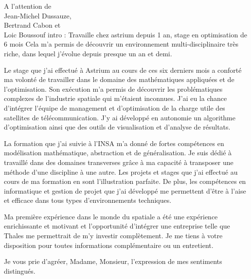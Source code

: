 \documentclass[12pt]{lettre}
\begin{document}
\begin{letter}{A l'attention de\\Jean-Michel Dussauze,\\Bertrand Cabon et\\ Loic Boussouf}
intro : Travaille chez astrium depuis 1 an, stage en optimisation de 6 mois
Cela m’a permis de découvrir un environnement multi-disciplinaire très riche, dans lequel j'évolue depuis presque un an et demi.


Le stage que j'ai effectué à Astrium au cours de ces six derniers mois a conforté ma volonté de travailler dans le domaine des mathématiques appliquées et de l'optimisation. Son exécution m'a permis de découvrir les problématiques complexes de l'industrie spatiale qui m'étaient inconnues. J'ai eu la chance d'intégrer l'équipe de management et d'optimisation de la charge utile des satellites de télécommunication. J'y ai développé en autonomie un algorithme d'optimisation ainsi que des outils de visualisation et d'analyse de résultats.

La formation que j'ai suivie à l'INSA m'a donné de fortes compétences en modélisation mathématique, abstraction et de généralisation. Je suis dédié à travaillé dans des domaines transverses grâce à ma capacité à transposer une méthode d'une discipline à une autre. Les projets et stages que j'ai effectué au cours de ma formation en sont l'illustration parfaite. De plus, les compétences en informatique et gestion de projet que j'ai développé me permettent d'être à l'aise et efficace dans tous types d'environnements techniques.%

Ma première expérience dans le monde du spatiale a été une expérience enrichissante et motivant et l'opportunité d'intégrer une entreprise  telle que Thales me permettrait de m'y investir complètement.
%
Je me tiens à votre disposition pour toutes informations complémentaire ou un entretient.
\closing{Je vous prie d'agréer, Madame, Monsieur, l'expression de mes sentiments distingués.}
\end{letter}
\end{document}
